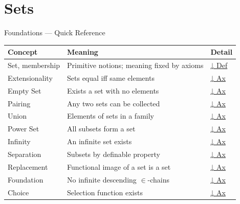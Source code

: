 \section{Sets}




\begin{toolkitbox}{Foundations — Quick Reference}
\small
\begin{tabular}{l l l}
\toprule
\textbf{Concept} & \textbf{Meaning} & \textbf{Detail} \\
\midrule
Set, membership        & Primitive notions; meaning fixed by axioms & \hyperref[def:set-membership]{↓ Def} \\
Extensionality         & Sets equal iff same elements & \hyperref[ax:extensionality]{↓ Ax} \\
Empty Set              & Exists a set with no elements & \hyperref[ax:empty-set]{↓ Ax} \\
Pairing                & Any two sets can be collected & \hyperref[ax:pairing]{↓ Ax} \\
Union                  & Elements of sets in a family & \hyperref[ax:union]{↓ Ax} \\
Power Set              & All subsets form a set & \hyperref[ax:power-set]{↓ Ax} \\
Infinity               & An infinite set exists & \hyperref[ax:infinity]{↓ Ax} \\
Separation             & Subsets by definable property & \hyperref[ax:separation]{↓ Ax} \\
Replacement            & Functional image of a set is a set & \hyperref[ax:replacement]{↓ Ax} \\
Foundation             & No infinite descending $\in$-chains & \hyperref[ax:foundation]{↓ Ax} \\
Choice                 & Selection function exists & \hyperref[ax:choice]{↓ Ax} \\
\bottomrule
\end{tabular}
\end{toolkitbox}

